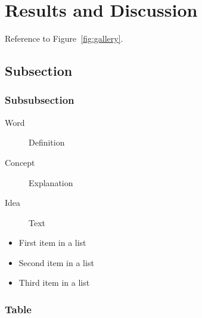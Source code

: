 \documentclass[
10pt, %
a4paper, %
oneside, %
headinclude,footinclude, %
BCOR5mm, %
]{scrartcl}
\begin{document}
\section{Results and Discussion}

Reference to Figure~\vref{fig:gallery}. %


\lipsum[10] %


\subsection{Subsection}

\lipsum[11] %

\subsubsection{Subsubsection}

\lipsum[12] %

\begin{description}
\item[Word] Definition
\item[Concept] Explanation
\item[Idea] Text
\end{description}

\lipsum[12] %

\begin{itemize}[noitemsep] %
\item First item in a list
\item Second item in a list
\item Third item in a list
\end{itemize}

\subsubsection{Table}
\end{document}
